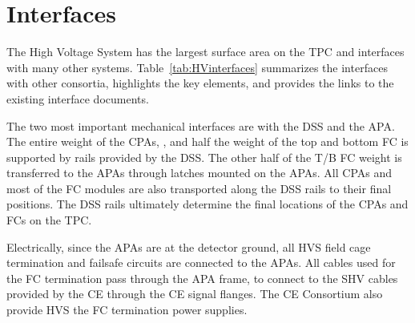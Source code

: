 \section{Interfaces }
\label{sec:fdsp-hv-intfc}




The High Voltage System has the largest surface area on the TPC and interfaces with many other systems.  Table~\ref{tab:HVinterfaces} summarizes the interfaces with other consortia, highlights the key elements, and provides the links to the existing interface documents.

The two most important mechanical interfaces are with the DSS and the APA.  The entire weight of the CPAs, ,  and half the weight of the top and bottom FC is supported by rails provided by the DSS.  The other half of the T/B FC weight is transferred to the APAs through latches mounted on the APAs. All CPAs and most of the FC modules are also transported along the DSS rails to their final positions. The DSS rails ultimately determine the final locations of the CPAs and FCs on the TPC.

Electrically, since the APAs are at the detector ground, all HVS field cage termination and failsafe circuits are connected to the APAs.  All cables used for the FC termination pass through the APA frame, to connect to the SHV cables provided by the CE through the CE signal flanges.  The CE Consortium also provide HVS the FC termination power supplies.




